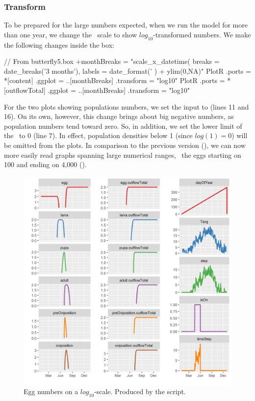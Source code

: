 \subsubsection{Transform \yaxis}
To be prepared for the large numbers expected, when we run the model for more than one year, we change the \yaxis\ scale to show $log_{10}$-transformed numbers. We make the following changes inside the  box:

\lstset{numbers=left}
\begin{boxscript}
// From butterfly5.box
+monthBreaks = "scale_x_datetime(
                  breaks = date_breaks('3 months'), 
                  labels = date_format('%
                ) + 
                ylim(0,NA)" 
PlotR {
  .ports = *[content]
  .ggplot = ..[monthBreaks]
  .transform = "log10" 
}
PlotR {
  .ports = *[outflowTotal]
  .ggplot = ..[monthBreaks]
  .transform = "log10" 
}
\end{boxscript}
\lstset{numbers=none}

For the two plots showing populations numbers, we set the  input to  (lines 11 and 16). On its own, however, this change brings about big negative numbers, as population numbers tend toward zero. So, in addition, we set the lower limit of the \yaxis\ to 0 (line 7). In effect, population densities below 1 (since $log(1)=0$) will be omitted from the plots. In comparison to the previous version (), we can now more easily read graphs spanning large numerical ranges, \eg\ the eggs starting on 100 and ending on 4,000 ().

\begin{figure} [h]
\centering
\includegraphics[width=\textwidth]{graphics/butterfly5}
\caption{Egg numbers on a $log_{10}$-scale. Produced by the  script.}
\label{fig:butterfly5}
\end{figure}


